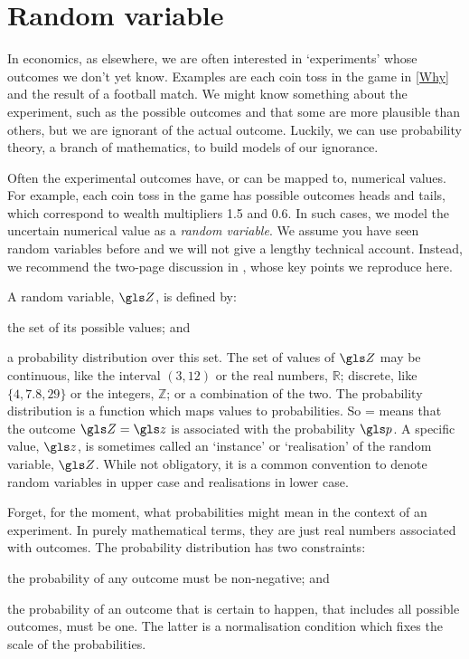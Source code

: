 \section{Random variable}
In economics, as elsewhere, we are often interested in `experiments' whose outcomes we don't yet know. Examples are each coin toss in the game in \cref{Why} and the result of a football match. We might know something about the experiment, such as the possible outcomes and that some are more plausible than others, but we are ignorant of the actual outcome. Luckily, we can use probability theory, a branch of mathematics, to build models of our ignorance.

Often the experimental outcomes have, or can be mapped to, numerical values. For example, each coin toss in the game has possible outcomes heads and tails, which correspond to wealth multipliers 1.5 and 0.6. In such cases, we model the uncertain numerical value as a \textit{random variable}. We assume you have seen random variables before and we will not give a lengthy technical account. Instead, we recommend the two-page discussion in \cite[p.~2]{vanKampen1992}, whose key points we reproduce here.

A random variable, $\Z$, is defined by:
\bi
\item the set of its possible values; and
\item a probability distribution over this set.
\ei
The set of values of $\Z$ may be continuous, like the interval $(3,12)$ or the real numbers, $\mathbb{R}$; discrete, like $\{4, 7.8, 29\}$ or the integers, $\mathbb{Z}$; or a combination of the two. The probability distribution is a function which maps values to probabilities. So
\be
\prob{\Z=\z}=\p
\ee
means that the outcome $\Z=\z$ is associated with the probability $\p$. A specific value, $\z$, is sometimes called an `instance' or `realisation' of the random variable, $\Z$. While not obligatory, it is a common convention to denote random variables in upper case and realisations in lower case.

Forget, for the moment, what probabilities might mean in the context of an experiment. In purely mathematical terms, they are just real numbers associated with outcomes. The probability distribution has two constraints:
\bi
\item the probability of any outcome must be non-negative; and
\item the probability of an outcome that is certain to happen, \ie that includes all possible outcomes, must be one.
\ei
The latter is a normalisation condition which fixes the scale of the probabilities.

